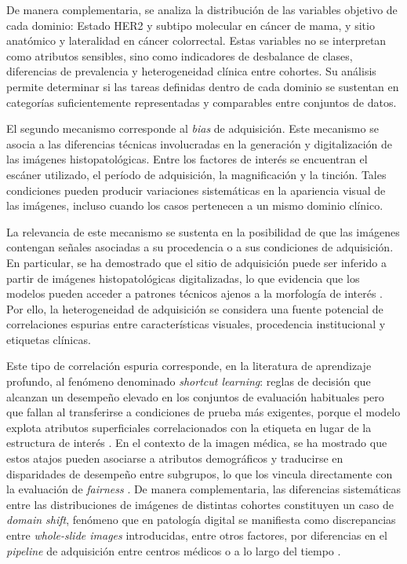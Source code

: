 De manera complementaria, se analiza la distribución de las variables objetivo de cada dominio: Estado HER2 y subtipo molecular en cáncer de mama, y sitio anatómico y lateralidad en cáncer colorrectal. Estas variables no se interpretan como atributos sensibles, sino como indicadores de desbalance de clases, diferencias de prevalencia y heterogeneidad clínica entre cohortes. Su análisis permite determinar si las tareas definidas dentro de cada dominio se sustentan en categorías suficientemente representadas y comparables entre conjuntos de datos.

El segundo mecanismo corresponde al \textit{bias} de adquisición. Este mecanismo se asocia a las diferencias técnicas involucradas en la generación y digitalización de las imágenes histopatológicas. Entre los factores de interés se encuentran el escáner utilizado, el período de adquisición, la magnificación y la tinción. Tales condiciones pueden producir variaciones sistemáticas en la apariencia visual de las imágenes, incluso cuando los casos pertenecen a un mismo dominio clínico.

La relevancia de este mecanismo se sustenta en la posibilidad de que las imágenes contengan señales asociadas a su procedencia o a sus condiciones de adquisición. En particular, se ha demostrado que el sitio de adquisición puede ser inferido a partir de imágenes histopatológicas digitalizadas, lo que evidencia que los modelos pueden acceder a patrones técnicos ajenos a la morfología de interés \parencite{alsaafin2023biased}. Por ello, la heterogeneidad de adquisición se considera una fuente potencial de correlaciones espurias entre características visuales, procedencia institucional y etiquetas clínicas.

Este tipo de correlación espuria corresponde, en la literatura de aprendizaje profundo, al fenómeno denominado \textit{shortcut learning}: reglas de decisión que alcanzan un desempeño elevado en los conjuntos de evaluación habituales pero que fallan al transferirse a condiciones de prueba más exigentes, porque el modelo explota atributos superficiales correlacionados con la etiqueta en lugar de la estructura de interés \parencite{geirhos2020shortcut}. En el contexto de la imagen médica, se ha mostrado que estos atajos pueden asociarse a atributos demográficos y traducirse en disparidades de desempeño entre subgrupos, lo que los vincula directamente con la evaluación de \textit{fairness} \parencite{brown2023shortcut}. De manera complementaria, las diferencias sistemáticas entre las distribuciones de imágenes de distintas cohortes constituyen un caso de \textit{domain shift}, fenómeno que en patología digital se manifiesta como discrepancias entre \textit{whole-slide images} introducidas, entre otros factores, por diferencias en el \textit{pipeline} de adquisición entre centros médicos o a lo largo del tiempo \parencite{stacke2021domainshift}.

